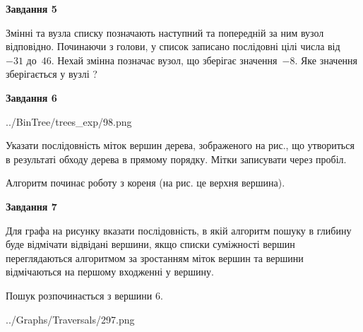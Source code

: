 \documentclass[12pt, ukrainian]{article}
\begin{document}
{\begin {large}
{\begin {center}\textbf{Завдання 5}\end {center}}\par
Змінні  та  вузла списку позначають наступний та попередній за ним вузол відповідно. Починаючи з голови, у список записано послідовні цілі числа від~$-31$ до~$46$. Нехай змінна  позначає вузол, що зберігає значення~$-8$.
Яке значення зберігається у вузлі  ?\par
\newpage

{\begin {center}\textbf{Завдання 6}\end {center}}\par

\begin{center}
	{../BinTree/trees_exp/98.png}
\end{center}
Указати послідовність міток вершин дерева, зображеного на рис., що утвориться в результаті обходу дерева в прямому порядку. Мітки записувати через пробіл.\par Алгоритм починає роботу з кореня (на рис. це верхня вершина).\par
\newpage

{\begin {center}\textbf{Завдання 7}\end {center}}\par
Для графа на рисунку вказати послідовність, в якій алгоритм пошуку в глибину буде відмічати відвідані вершини, якщо списки суміжності вершин переглядаються алгоритмом за зростанням міток вершин та вершини відмічаються на першому вход\-женні у вершину.\par
Пошук розпочинається з вершини 6.\par

\begin{center}
	{../Graphs/Traversals/297.png}
\end{center}\par
\newpage


\end{large}}
\end{document}
